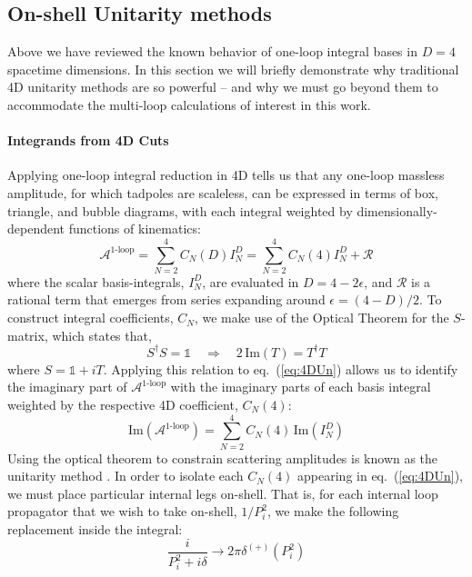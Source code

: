 \documentclass[11pt,letter]{article}
\def\eqn#1{eq.~(\ref{#1})}
\begin{document}
\subsection{On-shell Unitarity methods}\label{sec:genU}
Above we have reviewed the known behavior of one-loop integral bases in $D=4$ spacetime dimensions. In this section we will briefly demonstrate why traditional 4D unitarity methods are so powerful -- and why we must go beyond them to accommodate the multi-loop calculations of interest in this work. 
\paragraph{Integrands from 4D Cuts}
Applying one-loop integral reduction in 4D tells us that any one-loop massless amplitude, for which tadpoles are scaleless, can be expressed in terms of box, triangle, and bubble diagrams, with each integral weighted by dimensionally-dependent functions of kinematics:
\begin{equation}\label{eq:4DUn}
\mathcal{A}^{\text{1-loop}}= \sum_{N=2}^4 C_N(D)I_N^D = \sum_{N=2}^4 C_N(4)I_N^D+ \mathcal{R}
\end{equation}
where the scalar basis-integrals, $I_N^D$, are evaluated in $D=4-2\epsilon$, and $\mathcal{R}$ is a rational term that emerges from series expanding around $\epsilon=(4-D)/2$. To construct integral coefficients, $C_N$, we make use of the Optical Theorem for the $S$-matrix, which states that,
\begin{equation}
S^\dagger S = \mathbb{1} \quad \Rightarrow \quad 2\,\text{Im}(T) = T^\dagger T
\end{equation}
where $S=\mathbb{1}+iT$. Applying this relation to \eqn{eq:4DUn} allows us to identify the imaginary part of $\mathcal{A}^{\text{1-loop}}$ with the imaginary parts of each basis integral weighted by the respective 4D coefficient, $C_N(4)$:
\begin{equation}\label{eq:UnMeth1loop}
\text{Im}(\mathcal{A}^{\text{1-loop}}) = \sum_{N=2}^4 C_N(4)\, \text{Im}(I_N^D)
\end{equation}
Using the optical theorem to constrain scattering amplitudes is known as the unitarity method \cite{UnitarityMethod, BDKUniarityReview}. In order to isolate each $C_N(4)$ appearing in \eqn{eq:4DUn}, we must place particular internal legs on-shell. That is, for each internal loop propagator that we wish to take on-shell, $1/P_i^2$, we make the following replacement inside the integral:
\begin{equation}
\frac{i}{P_i^2 + i\delta} \rightarrow 2\pi \delta^{(+)}(P_i^2)
\end{equation}
\end{document}
